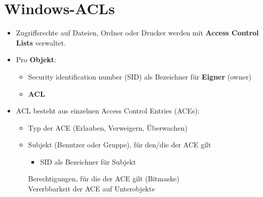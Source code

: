 \documentclass[openany]{book}
\begin{document}
\section{Windows-ACLs}

\begin{itemize}
\item Zugriffsrechte auf Dateien, Ordner oder Drucker werden mit \textbf{Access Control Lists} verwaltet.
\item Pro \textbf{Objekt}:
\begin{itemize}
\item Security identification number (SID) als Bezeichner für \textbf{Eigner} (owner)
\item \textbf{ACL}
\end{itemize}
\item ACL besteht aus einzelnen Access Control Entries (ACEs):
\begin{itemize}
\item Typ der ACE (Erlauben, Verweigern, Überwachen)
\item Subjekt (Benutzer oder Gruppe), für den/die der ACE gilt
\begin{itemize}
\item SID als Bezeichner für Subjekt
\end{itemize}
Berechtigungen, für die der ACE gilt (Bitmaske) \\ Vererbbarkeit der ACE auf Unterobjekte
\end{itemize}
\end{itemize}
\end{document}
